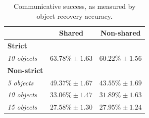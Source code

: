 \documentclass[11pt,a4paper]{article}
\newcommand{\nbEC}[1]{{\leavevmode\color{blue}{\scriptsize#1}}}
\newcommand{\nbSST}[1]{{\leavevmode\color{violet}{\scriptsize#1}}}
\begin{document}


\begin{table}[]
\begin{tabular}{lcc}
\toprule
                       & \textbf{Shared} & \textbf{Non-shared} \\ \midrule
\textbf{Strict} & \\
\emph{10 objects} & 
	$63.78\%\pm 1.63$  & $60.22\%\pm 1.56$      \\ %
\textbf{Non-strict} & \\
\emph{5 objects} &
	$49.37\%\pm 1.67$  & $43.55\%\pm 1.69$      \\
\emph{10 objects} &
	$33.06\%\pm 1.47$  & $31.89\%\pm 1.63$      \\
\emph{15 objects} &
	$27.58\%\pm 1.30$  & $27.95\%\pm 1.24$      \\ \bottomrule
\end{tabular}
\caption{Communicative success, as measured by object recovery accuracy.}\label{tab:object_prediction_accuracy}
\end{table}

\end{document}
